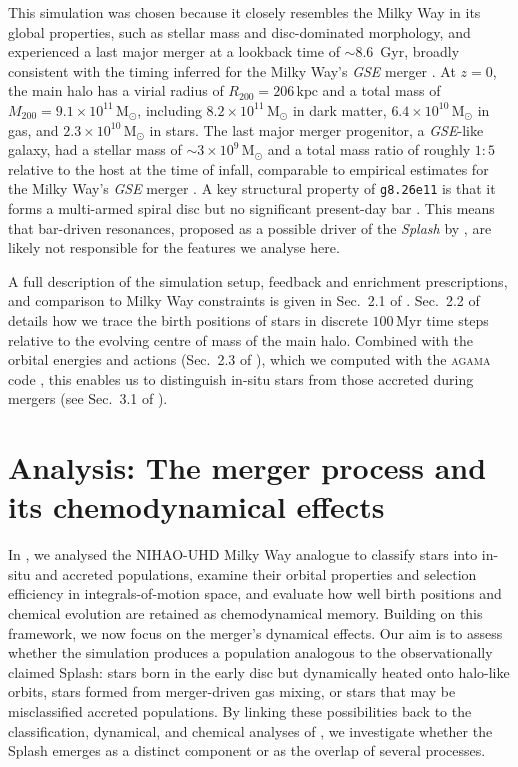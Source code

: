 \documentclass[fleqn,usenatbib]{mnras}
\begin{document}
This simulation was chosen because it closely resembles the Milky Way in its global properties, such as stellar mass and disc-dominated morphology, and experienced a last major merger at a lookback time of $\sim 8.6$~Gyr, broadly consistent with the timing inferred for the Milky Way's \textit{GSE} merger \citep{Helmi2018, Naidu2021}. At $z=0$, the main halo has a virial radius of $R_{200}=206\,\mathrm{kpc}$ and a total mass of $M_{200}=9.1\times10^{11}\,\mathrm{M_\odot}$, including $8.2\times10^{11}\,\mathrm{M_\odot}$ in dark matter, $6.4\times10^{10}\,\mathrm{M_\odot}$ in gas, and $2.3\times10^{10}\,\mathrm{M_\odot}$ in stars. The last major merger progenitor, a \textit{GSE}-like galaxy, had a stellar mass of $\sim 3\times10^9\,\mathrm{M_\odot}$ and a total mass ratio of roughly $1:5$ relative to the host at the time of infall, comparable to empirical estimates for the Milky Way's \textit{GSE} merger \citep[e.g.][]{Helmi2018, Naidu2021}.
A key structural property of \texttt{g8.26e11} is that it forms a multi-armed spiral disc but no significant present-day bar \citep{Buder2025}. This means that bar-driven resonances, proposed as a possible driver of the \textit{Splash} by \citet{Dillamore2022, Dillamore2023}, are likely not responsible for the features we analyse here.

A full description of the simulation setup, feedback and enrichment prescriptions, and comparison to Milky Way constraints is given in Sec.~2.1 of . Sec.~2.2 of  details how we trace the birth positions of stars in discrete $100\,\mathrm{Myr}$ time steps relative to the evolving centre of mass of the main halo. Combined with the orbital energies and actions (Sec.~2.3 of ), which we computed with the \textsc{agama} code \citep{Vasiliev2019b}, this enables us to distinguish in-situ stars from those accreted during mergers (see Sec.~3.1 of ).

\section{Analysis: The merger process and its chemodynamical effects} \label{sec:analysis}


In , we analysed the NIHAO-UHD Milky Way analogue to classify stars into in-situ and accreted populations, examine their orbital properties and selection efficiency in integrals-of-motion space, and evaluate how well birth positions and chemical evolution are retained as chemodynamical memory. Building on this framework, we now focus on the merger's dynamical effects. Our aim is to assess whether the simulation produces a population analogous to the observationally claimed Splash: stars born in the early disc but dynamically heated onto halo-like orbits, stars formed from merger-driven gas mixing, or stars that may be misclassified accreted populations. By linking these possibilities back to the classification, dynamical, and chemical analyses of , we investigate whether the Splash emerges as a distinct component or as the overlap of several processes.
\end{document}
